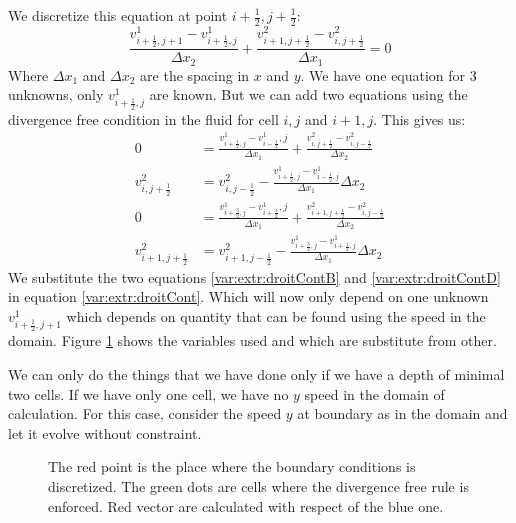 We discretize this equation at point $i+\frac{1}{2},j+\frac{1}{2}$:
\begin{equation}
\label{var:extr:droitCont}
	\frac{v^{1}_{i+\frac{1}{2},j+1}-v^{1}_{i+\frac{1}{2},j}}{\Delta x_{2}}+\frac{v^{2}_{i+1,j+\frac{1}{2}}-v^{2}_{i,j+\frac{1}{2}}}{\Delta x_{1}}=0
\end{equation}
Where $\Delta x_{1}$ and $\Delta x_{2}$ are the spacing in $x$ and $y$.
We have one equation for 3 unknowns, only $v^{1}_{i+\frac{1}{2},j}$ are known.
But we can add two equations using the divergence free condition in the fluid for cell $i,j$ and $i+1,j$.
This gives us:
\begin{align}
\label{var:extr:droitContA}
	0&=\frac{v^{1}_{i+\frac{1}{2},j}-v^{1}_{i-\frac{1}{2}},j}{\Delta x_{1}}+\frac{v^{2}_{i,j+\frac{1}{2}}-v^{2}_{i,j-\frac{1}{2}}}{\Delta x_2}\\
\label{var:extr:droitContB}
	v^{2}_{i,j+\frac{1}{2}}&=v^{2}_{i,j-\frac{1}{2}}-\frac{v^{1}_{i+\frac{1}{2},j}-v^{1}_{i-\frac{1}{2},j}}{\Delta x_{1}}\Delta x_{2}\\
\label{var:extr:droitContC}
	0&=\frac{v^{1}_{i+\frac{3}{2},j}-v^{1}_{i+\frac{1}{2}},j}{\Delta x_{1}}+\frac{v^{2}_{i+1,j+\frac{1}{2}}-v^{2}_{i,j-\frac{1}{2}}}{\Delta x_2}\\
\label{var:extr:droitContD}
	v^{2}_{i+1,j+\frac{1}{2}}&=v^{2}_{i+1,j-\frac{1}{2}}-\frac{v^{1}_{i+\frac{3}{2},j}-v^{1}_{i+\frac{1}{2},j}}{\Delta x_{1}}\Delta x_{2}
\end{align}
We substitute the two equations \ref{var:extr:droitContB} and \ref{var:extr:droitContD} in equation \ref{var:extr:droitCont}.
Which will now only depend on one unknown $v^{1}_{i+\frac{1}{2},j+1}$ which depends on quantity that can be found using the speed in the domain.
Figure \ref{topology:extrap:plane} shows the variables used and which are substitute from other.

We can only do the things that we have done only if we have a depth of minimal two cells.
If we have only one cell, we have no $y$ speed in the domain of calculation.
For this case, consider the speed $y$ at boundary as in the domain and let it evolve without constraint.

\begin{figure}
\caption{The red point is the place where the boundary conditions is discretized.
The green dots are cells where the divergence free rule is enforced. Red vector are calculated with respect of the blue one.}
\label{topology:extrap:plane}
\end{figure}

